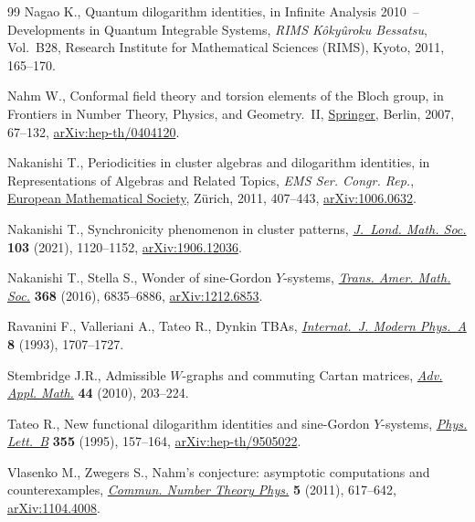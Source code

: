 \documentclass[10pt,a4paper]{amsart}
\numberwithin{equation}{section}
\theoremstyle{definition}
\begin{document}
\begin{thebibliography}{99}
Nagao K., Quantum dilogarithm identities, in Infinite {A}nalysis 2010~--
 {D}evelopments in {Q}uantum {I}ntegrable {S}ystems, \textit{RIMS K\^oky\^uroku
 Bessatsu}, Vol.~B28, Research Institute for Mathematical Sciences (RIMS), Kyoto,
 2011, 165--170.

Nahm W., Conformal field theory and torsion elements of the {B}loch group, in
 Frontiers in {N}umber {T}heory, {P}hysics, and {G}eometry.~{II},
 \href{https://doi.org/10.1007/978-3-540-30308-4_2}{Springer}, Berlin, 2007,
 67--132, \href{http://arxiv.org/abs/hep-th/0404120}{arXiv:hep-th/0404120}.

Nakanishi T., Periodicities in cluster algebras and dilogarithm identities, in
 Representations of {A}lgebras and {R}elated {T}opics, \textit{EMS Ser. Congr. Rep.},
 \href{https://doi.org/10.4171/101-1/9}{European Mathematical Society},
 Z\"urich, 2011, 407--443,
 \href{http://arxiv.org/abs/1006.0632}{arXiv:1006.0632}.

Nakanishi T., Synchronicity phenomenon in cluster patterns,
 \href{https://doi.org/10.1112/jlms.12402}{\textit{J.~Lond. Math. Soc.}}
 \textbf{103} (2021), 1120--1152,
 \href{http://arxiv.org/abs/1906.12036}{arXiv:1906.12036}.

Nakanishi T., Stella S., Wonder of sine-{G}ordon {$Y$}-systems,
 \href{https://doi.org/10.1090/tran/6505}{\textit{Trans. Amer. Math. Soc.}}
 \textbf{368} (2016), 6835--6886,
 \href{http://arxiv.org/abs/1212.6853}{arXiv:1212.6853}.

Ravanini F., Valleriani A., Tateo R., Dynkin {TBA}s,
 \href{https://doi.org/10.1142/S0217751X93000709}{\textit{Internat.~J. Modern
 Phys.~A}} \textbf{8} (1993), 1707--1727.

Stembridge J.R., Admissible {$W$}-graphs and commuting {C}artan matrices,
 \href{https://doi.org/10.1016/j.aam.2009.08.001}{\textit{Adv. Appl. Math.}}
 \textbf{44} (2010), 203--224.

Tateo R., New functional dilogarithm identities and sine-{G}ordon
 {$Y$}-systems,
 \href{https://doi.org/10.1016/0370-2693(95)00751-6}{\textit{Phys. Lett.~B}}
 \textbf{355} (1995), 157--164,
 \href{http://arxiv.org/abs/hep-th/9505022}{arXiv:hep-th/9505022}.

Vlasenko M., Zwegers S., Nahm's conjecture: asymptotic computations and
 counterexamples,
 \href{https://doi.org/10.4310/CNTP.2011.v5.n3.a2}{\textit{Commun. Number
 Theory Phys.}} \textbf{5} (2011), 617--642,
 \href{http://arxiv.org/abs/1104.4008}{arXiv:1104.4008}.


\end{thebibliography}
\end{document}

